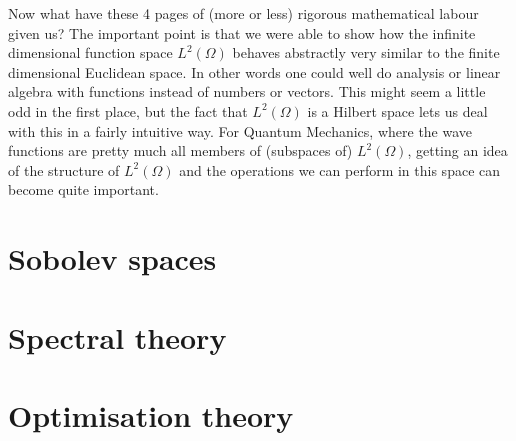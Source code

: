\begin{rem}
	Now what have these 4 pages of (more or less) rigorous mathematical labour given us?
	The important point is that we were able to show how the infinite dimensional function space $L^2(\Omega)$ behaves abstractly very similar to the finite dimensional Euclidean space.
	In other words one could well do analysis or linear algebra with functions instead of numbers or vectors. 
	This might seem a little odd in the first place, but the fact that $L^2(\Omega)$ is a Hilbert space lets us deal with this in a fairly intuitive way.
	For Quantum Mechanics, where the wave functions are pretty much all members of (subspaces of) $L^2(\Omega)$, getting an idea of the structure of $L^2(\Omega)$ and the operations we can perform in this space can become quite important.
\end{rem}

\section{Sobolev spaces}


\section{Spectral theory}

\section{Optimisation theory}

